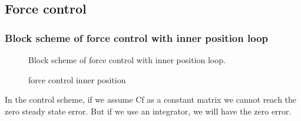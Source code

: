 \documentclass{article}
\begin{document}
\subsection{Force control}

\subsubsection{Block scheme of force control with inner position loop}
\begin{figure}[H]
    \centering
    \caption{Block scheme of force control with inner position loop.}
    \label{fig:Block scheme of force control with inner position loop.}
\end{figure}


\begin{figure}[H]
    \centering
    \caption{force control inner position}
    \label{fig:force_control_inner_position_graph}
\end{figure}


In the control scheme, if we assume Cf as a constant matrix we cannot reach the zero steady state error.
But if we use an integrator, we will have the zero error.
\end{document}
